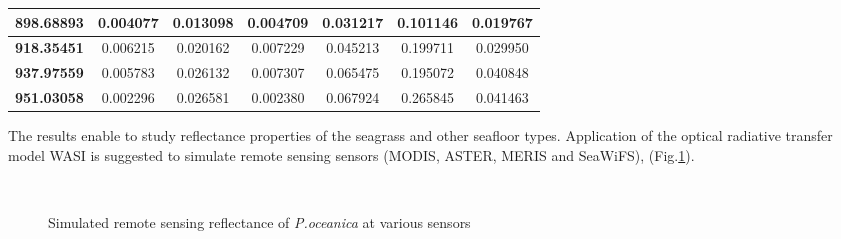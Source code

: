 \documentclass[10pt, a4paper]{article}
\begin{document}
\begin{table}[htbp]
\begin{center}
\begin{tabular}{|c|c|c|c|c|c|c|}
		\textbf{898.68893} & 0.004077 & 0.013098 & 0.004709 & 0.031217 & 0.101146 & 0.019767 \\ \hline
		\textbf{918.35451} & 0.006215 & 0.020162 & 0.007229 & 0.045213 & 0.199711 & 0.029950 \\ \hline
		\textbf{937.97559} & 0.005783 & 0.026132 & 0.007307 & 0.065475 & 0.195072 & 0.040848 \\ \hline
		\textbf{951.03058} & 0.002296 & 0.026581 & 0.002380 & 0.067924 & 0.265845 & 0.041463 \\ \hline
	\end{tabular}
	\end{center}
\end{table}

The results enable to study reflectance properties of the seagrass and other
seafloor types. Application of the optical radiative transfer model WASI is suggested to simulate
remote sensing sensors (MODIS, ASTER, MERIS and SeaWiFS), (Fig.\ref{fig:4.6}).

\begin{figure}[h]
	\centering
	\\
	\caption{Simulated remote sensing reflectance of \textit{P.oceanica} at various sensors}
	\label{fig:4.6}
\end{figure}
\end{document}
